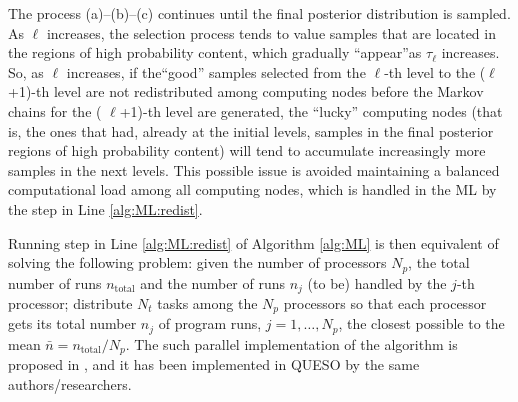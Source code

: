The process (a)--(b)--(c) continues until the final posterior distribution is sampled.  As $\ell$ increases, the selection process tends to value samples that are located in the regions of high probability content, which gradually ``appear''as  $\tau_\ell$ increases. So, as $\ell$ increases, if the``good'' samples selected from the  $\ell$-th level to the ($\ell$+1)-th level are not redistributed among computing nodes before the Markov chains for the ( $\ell$+1)-th level are generated, the ``lucky'' computing nodes (that is, the ones that had, already at the initial levels, samples in the final posterior regions of high probability content) will tend to accumulate increasingly more samples in the next levels. This possible issue is avoided maintaining a balanced computational load among all computing
nodes, which is handled in the ML by the step in Line \ref{alg:ML:redist}. 

Running step in Line \ref{alg:ML:redist} of Algorithm \ref{alg:ML} is then equivalent of solving the following problem: given the number of processors $N_p$, the total number of runs $n_\text{total}$ and the number of runs $n_j$ (to be) handled by the $j$-th processor; distribute $N_t$ tasks among the $N_p$ processors so that each processor gets its total number $n_j$ of program runs, $j = 1, \ldots, N_p$, the closest possible to the mean $\bar{n}=n_\text{total}/N_p$. The such parallel implementation of the algorithm is proposed in \cite{CheungPrudencio2012}, and it has been implemented in QUESO by the same authors/researchers.

% 







